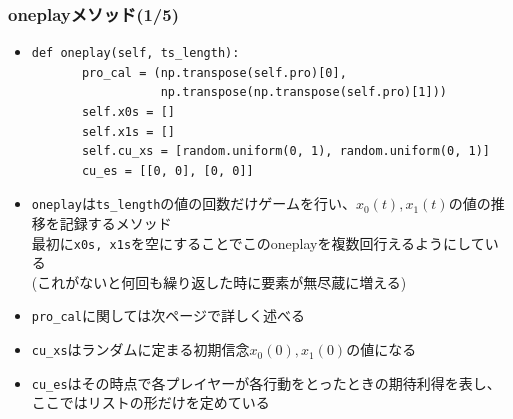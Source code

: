 \documentclass[dvipdfmx,fleqn]{beamer}
\begin{document}
\begin{frame}[fragile]%
\frametitle{oneplayメソッド(1/5)}
\begin{itemize}\setlength{\parskip}{0.5em}
\item

\footnotesize
\begin{verbatim}
def oneplay(self, ts_length):
       pro_cal = (np.transpose(self.pro)[0],
                  np.transpose(np.transpose(self.pro)[1]))
       self.x0s = []
       self.x1s = []
       self.cu_xs = [random.uniform(0, 1), random.uniform(0, 1)]
       cu_es = [[0, 0], [0, 0]]
 \end{verbatim}\pause
\normalsize

\item
\verb|oneplay|は\verb|ts_length|の値の回数だけゲームを行い、$x_0(t),x_1(t)$の値の推移を記録するメソッド\pause\\
最初に\verb|x0s, x1s|を空にすることでこのoneplayを複数回行えるようにしている\\
(これがないと何回も繰り返した時に要素が無尽蔵に増える)\pause
\item
\verb|pro_cal|に関しては次ページで詳しく述べる
\item
\verb|cu_xs|はランダムに定まる初期信念$x_0(0),x_1(0)$の値になる\pause
\item
\verb|cu_es|はその時点で各プレイヤーが各行動をとったときの期待利得を表し、ここではリストの形だけを定めている
\end{itemize}
\end{frame}
\end{document}
